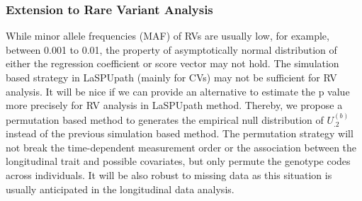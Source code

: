 \documentclass[12pt]{article}
\begin{document}
\subsubsection{Extension to Rare Variant Analysis}
While minor allele frequencies (MAF) of RVs are usually low, for example, between 0.001 to 0.01, the property of asymptotically normal distribution of either the regression coefficient or score vector may not hold. The simulation based strategy in LaSPUpath (mainly for CVs) may not be sufficient for RV analysis. It will be nice if we can provide an alternative to estimate the p value more precisely for RV analysis in LaSPUpath method. Thereby, we propose a permutation based method to generates the empirical null distribution of $U_{.2}^{ (b) }$ instead of the previous simulation based method. The permutation strategy will not break the time-dependent measurement order or the association between the longitudinal trait and possible covariates, but only permute the genotype codes across individuals. It will be also robust to missing data as this situation is usually anticipated in the longitudinal data analysis. 
\end{document}
